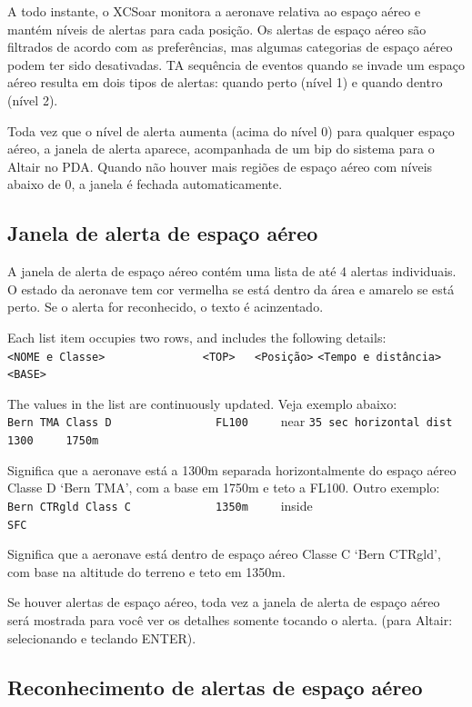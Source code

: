 A todo instante, o XCSoar monitora a aeronave relativa ao espaço aéreo e mantém níveis de alertas para cada posição.  Os alertas de espaço aéreo são filtrados de acordo com as preferências, mas algumas categorias de espaço aéreo podem ter sido desativadas.  
TA sequência de eventos quando se invade um espaço aéreo resulta em dois tipos de alertas: quando perto (nível 1) e quando dentro (nível 2).

Toda vez que o nível de alerta aumenta (acima do nível 0) para qualquer espaço aéreo, a janela de alerta aparece, acompanhada de um bip do sistema para o Altair no PDA.  Quando não houver mais regiões de espaço aéreo com níveis abaixo de 0, a janela é fechada automaticamente. 


\subsection*{Janela de alerta de espaço aéreo}

A janela de alerta de espaço aéreo contém uma lista de até 4 alertas individuais.  O estado da aeronave tem cor vermelha se está dentro da área e amarelo se está perto.  Se o alerta for reconhecido, o texto é acinzentado.

Each list item occupies two rows, and includes the following details:\\
\verb+<NOME e Classe>               <TOP>   <Posição>+
\verb+<Tempo e distância> <BASE>+

The values in the list are continuously updated. 
Veja exemplo abaixo:\\
\verb+Bern TMA Class D                FL100     +\colorbox{AirspaceYellow}{near}
\verb+35 sec horizontal dist 1300     1750m+

Significa que a aeronave está a 1300m separada horizontalmente do espaço aéreo Classe D `Bern TMA', com a base em 1750m e teto a FL100.
Outro exemplo:\\
\verb+Bern CTRgld Class C             1350m     +\colorbox{AirspaceRed}{inside}
\verb+                                SFC+

Significa que a aeronave está dentro de espaço aéreo Classe C `Bern CTRgld', com base na altitude do terreno e teto em 1350m.

Se houver alertas de espaço aéreo, toda vez a janela de alerta de espaço aéreo será mostrada para você ver os detalhes somente tocando o alerta. (para Altair: selecionando e teclando ENTER).

\subsection*{Reconhecimento de alertas de espaço aéreo }

